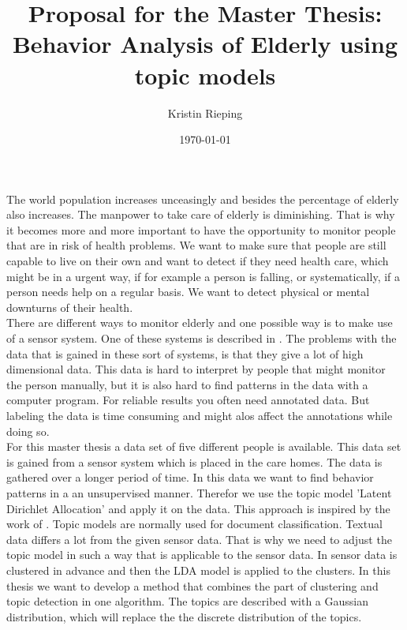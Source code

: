 \documentclass[a4paper,10pt]{article}
\title{Proposal for the Master Thesis: Behavior Analysis of Elderly using topic models}
\author{Kristin Rieping}
\date{\today}
\begin{document}
\maketitle
The world population increases unceasingly and besides the percentage of elderly also increases. The manpower to take care of elderly is diminishing. That is why it becomes more and more important to have the opportunity to monitor people that are in risk of health problems. We want to make sure that people are still capable to live on their own and want to detect if they need health care, which might be in a urgent way, if for example a person is falling, or systematically, if a person needs help on a regular basis. We want to detect physical or mental downturns of their health.\\
There are different ways to monitor elderly and one possible way is to make use of a sensor system.
One of these systems is described in \cite{van2010activity}. The problems with the data that is gained in these sort of systems, is that they give a lot of high dimensional data. This data is hard to interpret by people that might monitor the person manually, but it is also hard to find patterns in the data with a computer program. For reliable results you often need annotated data. But labeling the data is time consuming and might alos affect the annotations while doing so.\\

For this master thesis a data set of five different people is available. This data set is gained from a sensor system which is placed in the care homes. The data is gathered over a longer period of time. In this data we want to find behavior patterns in a an unsupervised manner. Therefor we use the topic model 'Latent Dirichlet Allocation' \cite{blei2003latent} and apply it on the data. This approach is inspired by the work of \cite{farrahi2008daily}.
Topic models are normally used for document classification. Textual data differs a lot from the given sensor data. That is why we need to adjust the topic model in such a way that is applicable to the sensor data. In \cite{Casale:2009} sensor data is clustered in advance and then the LDA model is applied to the clusters.
In this thesis we want to develop a method that combines the part of clustering and topic detection in one algorithm. The topics are described with a Gaussian distribution, which will replace the the discrete distribution of the topics.

\appendix
{}

\end{document}
